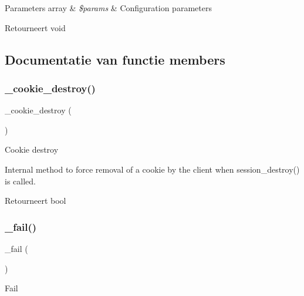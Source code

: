 \begin{DoxyParams}[1]{Parameters}
array & {\em \$params} & Configuration parameters \\
\hline
\end{DoxyParams}
\begin{DoxyReturn}{Retourneert}
void 
\end{DoxyReturn}


\subsection{Documentatie van functie members}
\mbox{\label{class_c_i___session__driver_a36771b622e8a8928c1c931ac56c12434}} 
\subsubsection{\texorpdfstring{\_cookie\_destroy()}{\_cookie\_destroy()}}
{\footnotesize\ttfamily \+\_\+cookie\+\_\+destroy (\begin{DoxyParamCaption}{ }\end{DoxyParamCaption})\hspace{0.3cm}{\ttfamily [protected]}}

Cookie destroy

Internal method to force removal of a cookie by the client when session\+\_\+destroy() is called.

\begin{DoxyReturn}{Retourneert}
bool 
\end{DoxyReturn}
\mbox{\label{class_c_i___session__driver_a1b1bf5bb9cba50e84f985c30f6b64773}} 
\subsubsection{\texorpdfstring{\_fail()}{\_fail()}}
{\footnotesize\ttfamily \+\_\+fail (\begin{DoxyParamCaption}{ }\end{DoxyParamCaption})\hspace{0.3cm}{\ttfamily [protected]}}

Fail

